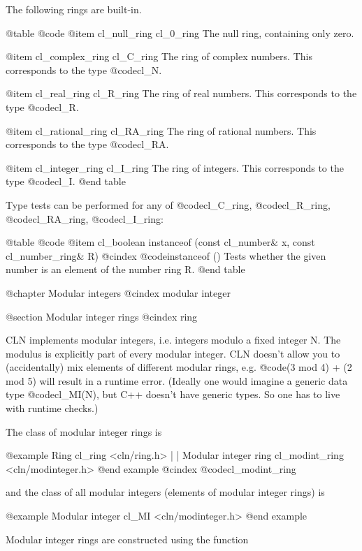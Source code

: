 The following rings are built-in.

@table @code
@item cl_null_ring cl_0_ring
The null ring, containing only zero.

@item cl_complex_ring cl_C_ring
The ring of complex numbers. This corresponds to the type @code{cl_N}.

@item cl_real_ring cl_R_ring
The ring of real numbers. This corresponds to the type @code{cl_R}.

@item cl_rational_ring cl_RA_ring
The ring of rational numbers. This corresponds to the type @code{cl_RA}.

@item cl_integer_ring cl_I_ring
The ring of integers. This corresponds to the type @code{cl_I}.
@end table

Type tests can be performed for any of @code{cl_C_ring}, @code{cl_R_ring},
@code{cl_RA_ring}, @code{cl_I_ring}:

@table @code
@item cl_boolean instanceof (const cl_number& x, const cl_number_ring& R)
@cindex @code{instanceof ()}
Tests whether the given number is an element of the number ring R.
@end table


@chapter Modular integers
@cindex modular integer

@section Modular integer rings
@cindex ring

CLN implements modular integers, i.e. integers modulo a fixed integer N.
The modulus is explicitly part of every modular integer. CLN doesn't
allow you to (accidentally) mix elements of different modular rings,
e.g. @code{(3 mod 4) + (2 mod 5)} will result in a runtime error.
(Ideally one would imagine a generic data type @code{cl_MI(N)}, but C++
doesn't have generic types. So one has to live with runtime checks.)

The class of modular integer rings is

@example
                         Ring
                       cl_ring
                     <cln/ring.h>
                          |
                          |
                 Modular integer ring
                    cl_modint_ring
                  <cln/modinteger.h>
@end example
@cindex @code{cl_modint_ring}

and the class of all modular integers (elements of modular integer rings) is

@example
                    Modular integer
                         cl_MI
                   <cln/modinteger.h>
@end example

Modular integer rings are constructed using the function

